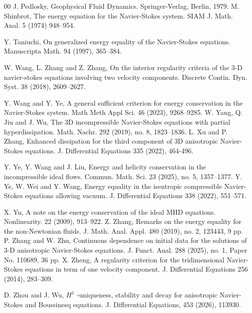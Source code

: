 \documentclass[11pt]{article}
\theoremstyle{plain}\newtheorem{definition}{Definition}[section]
\theoremstyle{definition}\newtheorem{theorem}{Theorem}[section]
\theoremstyle{plain}\newtheorem{lemma}[theorem]{Lemma}
\theoremstyle{plain}\newtheorem{coro}[theorem]{Corollary}
\theoremstyle{plain}\newtheorem{prop}[theorem]{Proposition}
\theoremstyle{remark}\newtheorem{remark}{Remark}[section]
\numberwithin{equation}{section}
\begin{document}
\begin{thebibliography}{00}
\bibitem{[Pedlosky]}
J. Pedlosky, Geophysical Fluid Dynamics. Springer-Verlag, Berlin, 1979.
	\bibitem{[Shinbrot]}
M. Shinbrot, The energy equation for the Navier-Stokes system. SIAM J. Math. Anal. 5 (1974) 948--954.
			
\bibitem{[Taniuchi]}
 Y. Taniuchi, On generalized energy equality of the Navier-Stokes equations.
Manuscripta Math. 94 (1997), 365--384.

\bibitem{[WZZ]}
W. Wang, L. Zhang and Z. Zhang,
On the interior regularity criteria of the 3-D navier-stokes equations involving two velocity components. Discrete Contin. Dyn. Syst.
  38 (2018),   2609--2627.

\bibitem{[WY]}
Y. Wang and Y. Ye, A general sufficient criterion for energy conservation in the Navier-Stokes system.  Math Meth Appl Sci.  46 (2023), 9268--9285.
\bibitem{[YJW]}
W. Yang, Q. Jiu and J. Wu, The 3D incompressible Navier-Stokes equations with partial hyperdissipation. Math. Nachr. 292 (2019), no. 8, 1823--1836.
\bibitem{[XZ]}
L. Xu and P. Zhang,  Enhanced dissipation for the third component of 3D anisotropic Navier-Stokes equations. J. Differential Equations 335 (2022), 464-496.


 \bibitem{[YWL]} Y. Ye,  Y. Wang and  J. Liu, Energy and helicity conservation in the incompressible ideal flows. Commun. Math. Sci. 23 (2025), no. 5, 1357--1377.
 \bibitem{[YWW]} Y. Ye,   W. Wei and Y. Wang, Energy equality in the isentropic compressible Navier-Stokes equations allowing vacuum. J. Differential Equations 338 (2022), 551--571.

\bibitem{[Yu]}X. Yu,  A note on the energy conservation of the ideal MHD equations. Nonlinearity. 22 (2009), 913--922.
\bibitem{[Zhang]}
		Z.	Zhang,  Remarks on the energy equality for the non-Newtonian fluids. J. Math. Anal. Appl. 480 (2019), no. 2, 123443, 9 pp.
		\bibitem{[ZZ]}
		P. Zhang and W. Zhu, Continuous dependence on initial data for the solutions of 3-D anisotropic Navier-Stokes equations. J. Funct. Anal. 288 (2025), no. 1, Paper No. 110689, 36 pp.
\bibitem{[Zheng]}
X. Zheng, A regularity criterion for the tridimensional Navier-Stokes equations in term
of one velocity component. J. Differential Equations 256 (2014), 283--309.

\bibitem{[ZW]}
D. Zhou and J. Wu, $H^1$ -uniqueness, stability and decay for anisotropic Navier-Stokes and Boussinesq equations.
J. Differential Equations,   453 (2026),  113930.

\end{thebibliography}


\end{document}
